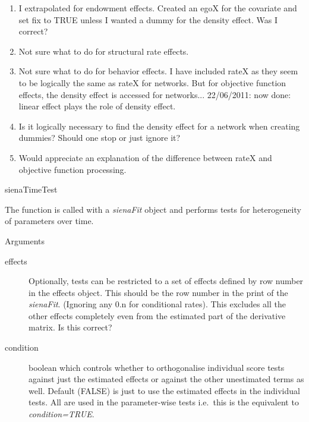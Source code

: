 \documentclass[12pt,a4paper]{article}
\makeatletter
\renewcommand{\=}{\,=\,}
\newcommand{\+}{\,+\,}
\newcommand{\nnm}[1]{\textsf{\small\textit{#1}}}
\renewcommand{\section}{\@startsection{section}{1}
                {0pt}{\baselineskip}{0.5\baselineskip}
                {\centering\sffamily} }
\renewcommand{\subsection}{\@startsection{subsection}{2}
                {0pt}{0.7\baselineskip}{0.3\baselineskip}
                {\sffamily} }
\makeatother
\begin{document}
\begin{enumerate}
\item I extrapolated for endowment effects. Created an egoX for the covariate
  and set fix to TRUE unless I wanted a dummy for the density effect. Was I
  correct?
\item Not sure what to do for structural rate effects.
\item Not sure what to do for behavior effects. I have included rateX as they
  seem to be logically the same as rateX for networks. But for objective
  function effects, the density effect is accessed for networks...
22/06/2011: now done: linear effect plays the role of density effect.
\item Is it logically necessary to find the density effect for a network when
  creating dummies? Should one stop or just ignore it?
\item Would appreciate an explanation of the difference between rateX and
  objective function processing.
\end{enumerate}

\section{sienaTimeTest}

The function is called with a \nnm{sienaFit} object and performs tests for
heterogeneity of parameters over time.

\subsection{Arguments}
\begin{description}
\item[effects] Optionally, tests can be restricted to a set of effects defined
  by row number in the effects object. This should be the row number in the
  print of the \nnm{sienaFit}. (Ignoring any 0.n for conditional rates).
  This excludes all the other effects completely even from the estimated part of
  the derivative matrix. Is this correct?
\item[condition] boolean which controls whether to orthogonalise
individual score tests against just the estimated effects or against the other
unestimated terms as well. Default (FALSE) is just to use the estimated effects
in the individual tests. All are used in the parameter-wise tests i.e.\ this is
the equivalent to \emph{condition=TRUE}.
\end{description}
\end{document}
